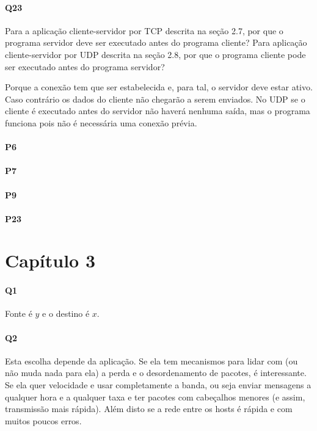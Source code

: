 \paragraph{Q23} Para a aplicação cliente-servidor por TCP descrita na seção 2.7, por que o programa servidor deve ser executado antes do programa cliente? Para aplicação cliente-servidor por UDP descrita na seção 2.8, por que o programa cliente pode ser executado antes do programa servidor?

Porque a conexão tem que ser estabelecida e, para tal, o servidor deve estar ativo. Caso contrário os dados do cliente não chegarão a serem enviados.
No UDP se o cliente é executado antes do servidor não haverá nenhuma saída, mas o programa funciona pois não é necessária uma conexão prévia.

\paragraph{P6}

\paragraph{P7}

\paragraph{P9}

\paragraph{P23}

\section{Capítulo 3}

\paragraph{Q1} Fonte é $y$ e o destino é $x$.

\paragraph{Q2} Esta escolha depende da aplicação. 
Se ela tem mecanismos para lidar com (ou não muda nada para ela) a perda e o desordenamento de pacotes, é interessante. 
Se ela quer velocidade e usar completamente a banda, ou seja enviar mensagens a qualquer hora e a qualquer taxa e ter pacotes com cabeçalhos menores (e assim, transmissão mais rápida).
Além disto se a rede entre os hosts é rápida e com muitos poucos erros.

